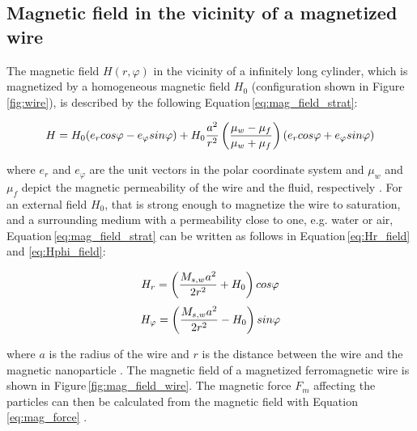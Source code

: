 \subsection{Magnetic field in the vicinity of a magnetized wire}
\label{subsec:mag_field}
The magnetic field $H(r,\varphi)$ in the vicinity of a infinitely long cylinder, which is magnetized by a homogeneous magnetic field $H_{0}$ (configuration shown in Figure\,\ref{fig:wire}), is described by the following Equation\,\ref{eq:mag_field_strat}:

\begin{equation}
\label{eq:mag_field_strat}
\centering
H = H_{0}(e_{r}cos\varphi-e_{\varphi}sin\varphi)+H_{0}\frac{a^{2}}{r^{2}}\left(\frac{\mu_{w}-\mu_{f}}{\mu_{w}+\mu_{f}}\right)(e_{r}cos\varphi+e_{\varphi}sin\varphi)
\end{equation}

where $e_{r}$ and $e_{\varphi}$ are the unit vectors in the polar coordinate system and $\mu_{w}$ and $\mu_{f}$ depict the magnetic permeability of the wire and the fluid, respectively \cite{stratton2007electromagnetic}. For an external field $H_{0}$, that is strong enough to magnetize the wire to saturation, and a surrounding medium with a permeability close to one, e.g. water or air, Equation\,\ref{eq:mag_field_strat} can be written as follows in Equation\,\ref{eq:Hr_field} and \ref{eq:Hphi_field}:

\begin{equation}
\label{eq:Hr_field}
\centering
H_{r} = \left(\frac{M_{s,w}a^{2}}{2r^{2}}+H_{0}\right)cos\varphi
\end{equation}
\begin{equation}
\label{eq:Hphi_field}
\centering
H_{\varphi} = \left(\frac{M_{s,w}a^{2}}{2r^{2}}-H_{0}\right)sin\varphi
\end{equation}

where $a$ is the radius of the wire and $r$ is the distance between the wire and the magnetic nanoparticle \cite{FranzrebHabil}. The magnetic field of a magnetized ferromagnetic wire is shown in Figure\,\ref{fig:mag_field_wire}. The magnetic force $F_{m}$ affecting the particles can then be calculated from the magnetic field with Equation\,\ref{eq:mag_force} \cite{moeser2004high}. 

